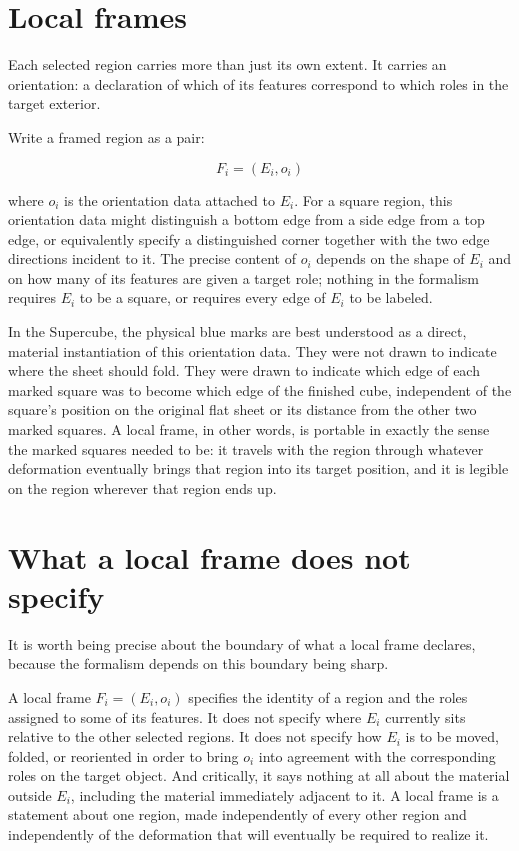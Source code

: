 \documentclass[11pt,oneside]{book}
\begin{document}
\hypertarget{local-frames}{%
\section{Local frames}\label{local-frames}}

Each selected region carries more than just its own extent. It carries
an orientation: a declaration of which of its features correspond to
which roles in the target exterior.

Write a framed region as a pair:

\[F_i = (E_i, o_i)\]

where \(o_i\) is the orientation data attached to \(E_i\). For a square
region, this orientation data might distinguish a bottom edge from a
side edge from a top edge, or equivalently specify a distinguished
corner together with the two edge directions incident to it. The precise
content of \(o_i\) depends on the shape of \(E_i\) and on how many of
its features are given a target role; nothing in the formalism requires
\(E_i\) to be a square, or requires every edge of \(E_i\) to be labeled.

In the Supercube, the physical blue marks are best understood as a
direct, material instantiation of this orientation data. They were not
drawn to indicate where the sheet should fold. They were drawn to
indicate which edge of each marked square was to become which edge of
the finished cube, independent of the square's position on the original
flat sheet or its distance from the other two marked squares. A local
frame, in other words, is portable in exactly the sense the marked
squares needed to be: it travels with the region through whatever
deformation eventually brings that region into its target position, and
it is legible on the region wherever that region ends up.

\hypertarget{what-a-local-frame-does-not-specify}{%
\section{What a local frame does not
specify}\label{what-a-local-frame-does-not-specify}}

It is worth being precise about the boundary of what a local frame
declares, because the formalism depends on this boundary being sharp.

A local frame \(F_i = (E_i, o_i)\) specifies the identity of a region
and the roles assigned to some of its features. It does not specify
where \(E_i\) currently sits relative to the other selected regions. It
does not specify how \(E_i\) is to be moved, folded, or reoriented in
order to bring \(o_i\) into agreement with the corresponding roles on
the target object. And critically, it says nothing at all about the
material outside \(E_i\), including the material immediately adjacent to
it. A local frame is a statement about one region, made independently of
every other region and independently of the deformation that will
eventually be required to realize it.
\end{document}
